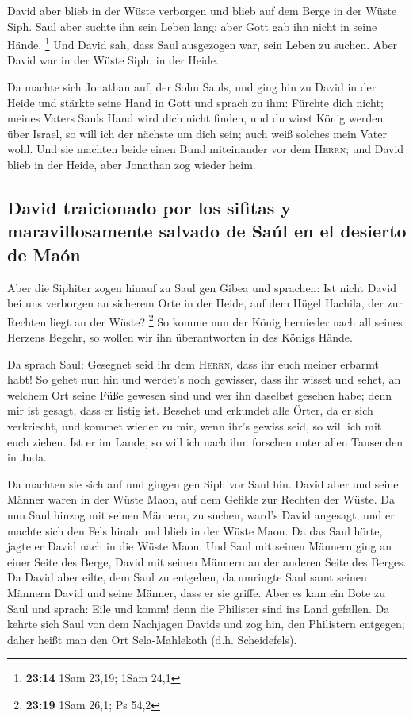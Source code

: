  David aber blieb in der Wüste verborgen und blieb auf
dem Berge in der Wüste Siph. Saul aber suchte ihn sein Leben lang; aber
Gott gab ihn nicht in seine Hände. \footnote{\textbf{23:14} 1Sam 23,19;
  1Sam 24,1}  Und David sah, dass Saul ausgezogen war,
sein Leben zu suchen. Aber David war in der Wüste Siph, in der Heide.

 Da machte sich Jonathan auf, der Sohn Sauls, und ging
hin zu David in der Heide und stärkte seine Hand in Gott 
und sprach zu ihm: Fürchte dich nicht; meines Vaters Sauls Hand wird
dich nicht finden, und du wirst König werden über Israel, so will ich
der nächste um dich sein; auch weiß solches mein Vater wohl.
 Und sie machten beide einen Bund miteinander vor dem
\textsc{Herrn}; und David blieb in der Heide, aber Jonathan zog wieder
heim.

\hypertarget{david-traicionado-por-los-sifitas-y-maravillosamente-salvado-de-sauxfal-en-el-desierto-de-mauxf3n}{%
\subsection{David traicionado por los sifitas y maravillosamente salvado
de Saúl en el desierto de
Maón}\label{david-traicionado-por-los-sifitas-y-maravillosamente-salvado-de-sauxfal-en-el-desierto-de-mauxf3n}}

 Aber die Siphiter zogen hinauf zu Saul gen Gibea und
sprachen: Ist nicht David bei uns verborgen an sicherem Orte in der
Heide, auf dem Hügel Hachila, der zur Rechten liegt an der Wüste?
\footnote{\textbf{23:19} 1Sam 26,1; Ps 54,2}  So komme
nun der König hernieder nach all seines Herzens Begehr, so wollen wir
ihn überantworten in des Königs Hände.

 Da sprach Saul: Gesegnet seid ihr dem \textsc{Herrn},
dass ihr euch meiner erbarmt habt!  So gehet nun hin und
werdet's noch gewisser, dass ihr wisset und sehet, an welchem Ort seine
Füße gewesen sind und wer ihn daselbst gesehen habe; denn mir ist
gesagt, dass er listig ist.  Besehet und erkundet alle
Örter, da er sich verkriecht, und kommet wieder zu mir, wenn ihr's
gewiss seid, so will ich mit euch ziehen. Ist er im Lande, so will ich
nach ihm forschen unter allen Tausenden in Juda.

 Da machten sie sich auf und gingen gen Siph vor Saul
hin. David aber und seine Männer waren in der Wüste Maon, auf dem
Gefilde zur Rechten der Wüste.  Da nun Saul hinzog mit
seinen Männern, zu suchen, ward's David angesagt; und er machte sich den
Fels hinab und blieb in der Wüste Maon. Da das Saul hörte, jagte er
David nach in die Wüste Maon.  Und Saul mit seinen
Männern ging an einer Seite des Berge, David mit seinen Männern an der
anderen Seite des Berges. Da David aber eilte, dem Saul zu entgehen, da
umringte Saul samt seinen Männern David und seine Männer, dass er sie
griffe.  Aber es kam ein Bote zu Saul und sprach: Eile
und komm! denn die Philister sind ins Land gefallen.  Da
kehrte sich Saul von dem Nachjagen Davids und zog hin, den Philistern
entgegen; daher heißt man den Ort Sela-Mahlekoth (d.h. Scheidefels).

